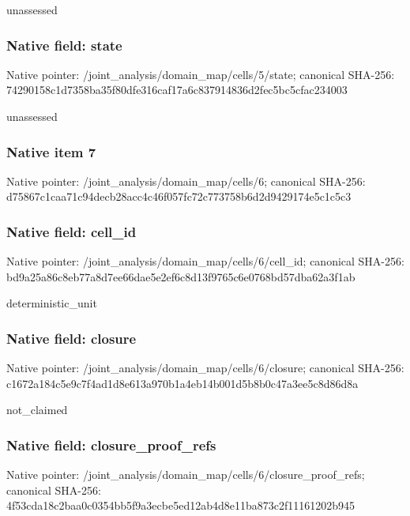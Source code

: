 \documentclass[10pt,a4paper]{article}
\begin{document}
\begingroup\raggedright\sloppy unassessed\par\endgroup

\subsubsection{Native field: state}
Native pointer: /joint\_\allowbreak{}analysis/domain\_\allowbreak{}map/cells/5/state; canonical SHA-256: 74290158c1d7358ba35f80dfe316caf17a6c837914836d2fec5bc5cfac234003

\begingroup\raggedright\sloppy unassessed\par\endgroup

\subsubsection{Native item 7}
Native pointer: /joint\_\allowbreak{}analysis/domain\_\allowbreak{}map/cells/6; canonical SHA-256: d75867c1caa71c94decb28acc4c46f057fc72c773758b6d2d9429174e5c1c5c3

\subsubsection{Native field: cell\_\allowbreak{}id}
Native pointer: /joint\_\allowbreak{}analysis/domain\_\allowbreak{}map/cells/6/cell\_\allowbreak{}id; canonical SHA-256: bd9a25a86c8eb77a8d7ee66dae5e2ef6c8d13f9765c6e0768bd57dba62a3f1ab

\begingroup\raggedright\sloppy deterministic\_\allowbreak{}unit\par\endgroup

\subsubsection{Native field: closure}
Native pointer: /joint\_\allowbreak{}analysis/domain\_\allowbreak{}map/cells/6/closure; canonical SHA-256: c1672a184c5e9c7f4ad1d8e613a970b1a4eb14b001d5b8b0c47a3ee5c8d86d8a

\begingroup\raggedright\sloppy not\_\allowbreak{}claimed\par\endgroup

\subsubsection{Native field: closure\_\allowbreak{}proof\_\allowbreak{}refs}
Native pointer: /joint\_\allowbreak{}analysis/domain\_\allowbreak{}map/cells/6/closure\_\allowbreak{}proof\_\allowbreak{}refs; canonical SHA-256: 4f53cda18c2baa0c0354bb5f9a3ecbe5ed12ab4d8e11ba873c2f11161202b945
\end{document}

